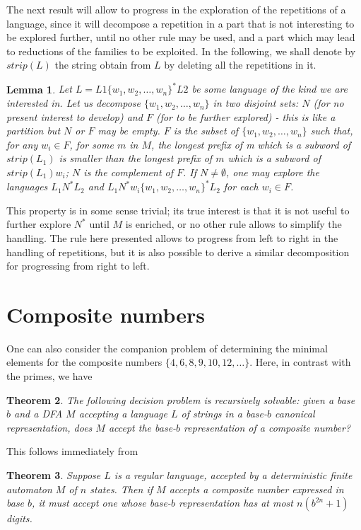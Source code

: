 \documentclass[12pt]{article}
\theoremstyle{plain}
\newtheorem{theorem}{Theorem}
\newtheorem{lemma}[theorem]{Lemma}
\theoremstyle{definition}
\theoremstyle{remark}
\newcommand{\0}{\mathtt{0}}
\newcommand{\1}{\mathtt{1}}
\newcommand{\2}{\mathtt{2}}
\newcommand{\3}{\mathtt{3}}
\newcommand{\4}{\mathtt{4}}
\newcommand{\5}{\mathtt{5}}
\newcommand{\6}{\mathtt{6}}
\newcommand{\7}{\mathtt{7}}
\newcommand{\8}{\mathtt{8}}
\newcommand{\9}{\mathtt{9}}
\begin{document}
The next result will allow to progress in the exploration of the repetitions of a language, %
since it will decompose a repetition in a part that is not interesting to be explored further, until no other rule may be used, and a part which may lead to reductions of the families to be exploited.
In the following, we shall denote by $strip(L)$ the string obtain from $L$ by deleting all the repetitions in it.
\begin{lemma} 
Let $L=L1\{w_1,w_2,\ldots,w_n\}^*L2$ be some language of the kind we are interested in. 
Let us decompose $\{w_1,w_2,\ldots,w_n\}$ in two disjoint sets: 
$N$ (for no present interest to develop) and 
$F$ (for to be further explored) - this is like a partition but $N$ or $F$ may be empty.
$F$ is the subset of $\{w_1,w_2,\ldots,w_n\}$ such that, for any $w_i\in F$,  
for some $m$ in $M$, the longest prefix of m which is a subword of $strip(L_1)$ is smaller than
the longest prefix of $m$ which is a subword of $strip(L_1) w_i$; $N$ is the complement of $F$.
If $N\neq \emptyset$,  one may explore the languages $L_1 N^* L_2$ and
$L_1 N^*w_i\{w_1,w_2,\ldots,w_n\}^* L_2$ for each $w_i\in F$.
\end{lemma}
This property is in some sense trivial; its true interest is that it is not useful to further explore $N^*$ until $M$ is enriched, or no other rule allows to simplify the handling.
The rule here presented allows to progress from left to right in the handling of repetitions,
 but it is also possible to derive a similar decomposition for progressing from right to left.

\section{Composite numbers}

One can also consider the companion problem of determining the
minimal elements for the composite numbers
$\lbrace 4,6,8,9,10, 12, \ldots \rbrace $.  
Here, in contrast with the primes, we have

\begin{theorem}
The following decision problem is recursively solvable:  given
a base $b$ and a DFA $M$ accepting a language $L$ of
strings in a base-$b$ canonical representation,
does $M$ accept the base-$b$ representation of a composite 
number?
\end{theorem}

This follows immediately from

\begin{theorem}
Suppose $L$ is a regular language, accepted by a 
deterministic finite automaton $M$ of $n$ states.  Then
if $M$ accepts a composite number expressed in base $b$, it must
accept one whose base-$b$ representation has at most
$n(b^{2n} + 1)$ digits.
\end{theorem}
\end{document}
